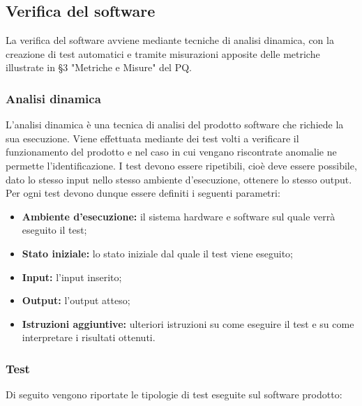 \documentclass[../NormediProgetto.tex]{subfiles}
\begin{document}
\subsection{Verifica del software}

La verifica del software avviene mediante tecniche di analisi dinamica, con la creazione di test automatici e tramite misurazioni apposite delle metriche illustrate in §3 "Metriche e Misure" del PQ.

\subsubsection{Analisi dinamica}

L’analisi dinamica è una tecnica di analisi del prodotto software che richiede la sua esecuzione. Viene effettuata mediante dei test volti a verificare il funzionamento del prodotto e nel caso in cui vengano riscontrate anomalie ne permette l’identificazione. I test devono essere ripetibili, cioè deve essere possibile, dato lo stesso input nello stesso ambiente d'esecuzione, ottenere lo stesso output. Per ogni test devono dunque essere definiti i seguenti parametri:

\begin{itemize}
    \item \textbf{Ambiente d'esecuzione:} il sistema hardware e software sul quale verrà eseguito il test;
    \item \textbf{Stato iniziale:} lo stato iniziale dal quale il test viene eseguito;
    \item \textbf{Input:} l’input inserito;
    \item \textbf{Output:} l’output atteso;
    \item \textbf{Istruzioni aggiuntive:} ulteriori istruzioni su come eseguire il test e su come interpretare i risultati ottenuti.
\end{itemize}

\subsubsection{Test}

Di seguito vengono riportate le tipologie di test eseguite sul software prodotto:
\end{document}
